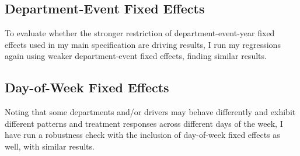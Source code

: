 \clearpage
\subsection{Department-Event Fixed Effects}
To evaluate whether the stronger restriction of department-event-year fixed effects used in my main specification are driving results, I run my regressions again using weaker department-event fixed effects, finding similar results. \\

\begin{table}
	\begin{center}
		
		\caption[Volume Outcome Estimates, Dept.-Event FEs]{This table gives volume outcome coefficient estimates for the treatment effect following a shooting event both overall using equation \ref{eq1_DiD} in Panel A and by scrutiny level using equation \ref{eq3_DiDiD} in Panel B.}
		\label{full_DiD_volumes_A01}
	\end{center}
\end{table}

\begin{table}
	\begin{center}
		
		\caption[Rate Outcome Estimates, Dept.-Event FEs]{This table gives rate outcome coefficient estimates for the treatment effect following a shooting event both overall using equation \ref{eq1_DiD} in Panel A and by scrutiny level using equation \ref{eq3_DiDiD} in Panel B.}
		\label{full_DiD_rates_A01}
	\end{center}
\end{table}

\clearpage
\subsection{Day-of-Week Fixed Effects}
Noting that some departments and/or drivers may behave differently and exhibit different patterns and treatment responses across different days of the week, I have run a robustness check with the inclusion of day-of-week fixed effects as well, with similar results. \\

